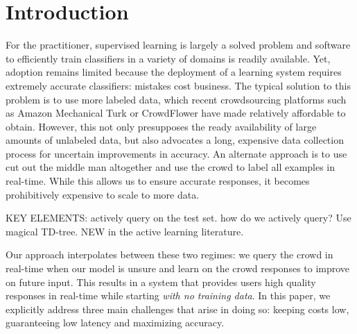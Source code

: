 
\section{Introduction}


For the practitioner, supervised learning is largely a solved problem and software to efficiently train classifiers in a variety of domains is readily available.
Yet, adoption remains limited because the deployment of a learning system requires extremely accurate classifiers: mistakes cost business.
The typical solution to this problem is to use more labeled data, which recent crowdsourcing platforms such as Amazon Mechanical Turk or CrowdFlower have made relatively affordable to obtain.
However, this not only presupposes the ready availability of large amounts of unlabeled data, but also advocates a long, expensive data collection process for uncertain improvements in accuracy.
An alternate approach is to use cut out the middle man altogether and use the crowd to label all examples in real-time\cite{cheng2015flock}. 
While this allows us to ensure accurate responses, it becomes prohibitively expensive to scale to more data. 

KEY ELEMENTS: actively query on the test set. how do we actively query? Use magical TD-tree. NEW in the active learning literature.



Our approach interpolates between these two regimes: we query the crowd in real-time when our model is unsure and learn on the crowd responses to improve on future input.
This results in a system that provides users high quality responses in real-time while starting {\em with no training data}.
In this paper, we explicitly address three main challenges that arise in doing so: keeping costs low, guaranteeing low latency and maximizing accuracy.

